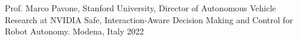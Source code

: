 \begin{cventries}
  \cventry
    {Prof. Marco Pavone, Stanford
University, Director of Autonomous Vehicle Research at NVIDIA} %
    {Safe, Interaction-Aware Decision Making and Control for Robot Autonomy.} %
    {Modena, Italy} %
    {2022} %
    {
    }

\end{cventries}
